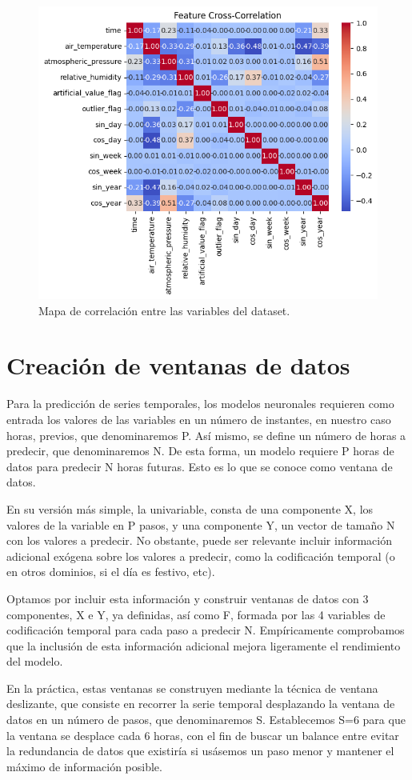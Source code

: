 \begin{figure}
    \centering
    \includegraphics[width=.5\linewidth]{images/correlation_heatmap.png}
    \caption{Mapa de correlación entre las variables del dataset.}
    \label{correlation_map}
\end{figure}

\section{Creación de ventanas de datos}
Para la predicción de series temporales, los modelos neuronales requieren como entrada los valores de las variables en un número de instantes, en nuestro caso horas,
previos, que denominaremos P. Así mismo, se define un número de horas a predecir, que denominaremos N. 
De esta forma, un modelo requiere P horas de datos para predecir N horas futuras. Esto es lo que se conoce como ventana de datos.

En su versión más simple, la univariable, consta de una componente X, los valores de la variable en P pasos, y una componente Y, un vector
de tamaño N con los valores a predecir. 
No obstante, puede ser relevante incluir información adicional exógena sobre los valores a predecir, como la codificación temporal 
(o en otros dominios, si el día es festivo, etc).

Optamos por incluir esta información y construir ventanas de datos con 3 componentes, X e Y, ya definidas, así como F, formada por las 4 variables de codificación temporal 
para cada paso a predecir N. Empíricamente comprobamos que la inclusión de esta información adicional mejora ligeramente el rendimiento del modelo.

En la práctica, estas ventanas se construyen mediante la técnica de ventana deslizante, que consiste en recorrer la serie temporal desplazando 
la ventana de datos en un número de pasos, que denominaremos S. Establecemos S=6 para que la ventana se desplace cada 6 horas, con el fin de buscar un balance 
entre evitar la redundancia de datos que existiría si usásemos un paso menor y mantener el máximo de información posible.

